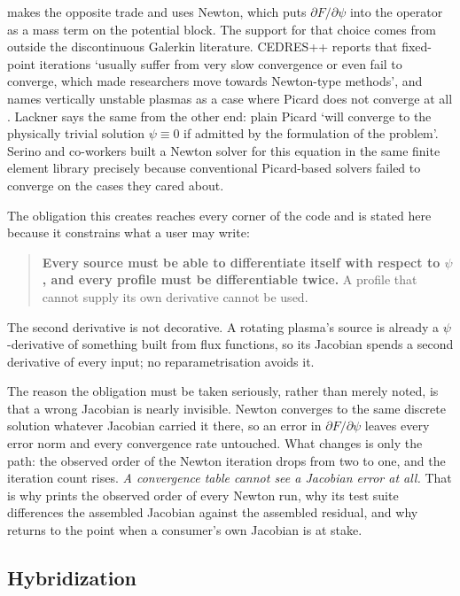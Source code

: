 {\meq} makes the opposite trade and uses Newton, which puts
$\partial F/\partial\psi$ into the operator as a mass term on the potential
block. The support for that choice comes from outside the discontinuous
Galerkin literature. CEDRES++ reports that fixed-point iterations `usually
suffer from very slow convergence or even fail to converge, which made
researchers move towards Newton-type methods', and names vertically unstable
plasmas as a case where Picard does not converge at all \cite{Heumann2015}.
Lackner \cite{Lackner1976} says the same from the other end: plain Picard `will
converge to the physically trivial solution $\psi \equiv 0$ if admitted by the
formulation of the problem'. Serino and co-workers \cite{Serino2024} built a
Newton solver for this equation in the same finite element library precisely
because conventional Picard-based solvers failed to converge on the cases they
cared about.

The obligation this creates reaches every corner of the code and is stated here
because it constrains what a user may write:

\begin{quote}
	\textbf{Every source must be able to differentiate itself with respect to
	$\psi$, and every profile must be differentiable twice.} A profile that
	cannot supply its own derivative cannot be used.
\end{quote}

The second derivative is not decorative. A rotating plasma's source is already
a $\psi$-derivative of something built from flux functions, so its Jacobian
spends a second derivative of every input; no reparametrisation avoids it.

The reason the obligation must be taken seriously, rather than merely noted, is
that a wrong Jacobian is nearly invisible. Newton converges to the same
discrete solution whatever Jacobian carried it there, so an error in
$\partial F/\partial\psi$ leaves every error norm and every convergence rate
untouched. What changes is only the path: the observed order of the Newton
iteration drops from two to one, and the iteration count rises. \emph{A
convergence table cannot see a Jacobian error at all.} That is why {\meq}
prints the observed order of every Newton run, why its test suite differences
the assembled Jacobian against the assembled residual, and why
 returns to the point when a consumer's own Jacobian is at
stake.

\subsection{Hybridization}

